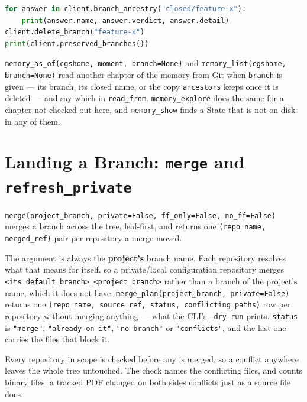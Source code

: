 \begin{lstlisting}[language=Python]
for answer in client.branch_ancestry("closed/feature-x"):
    print(answer.name, answer.verdict, answer.detail)
client.delete_branch("feature-x")
print(client.preserved_branches())
\end{lstlisting}

\texttt{memory\_as\_of(cgshome, moment, branch=None)} and
\texttt{memory\_list(cgshome, branch=None)} read another chapter of the
memory from Git when \texttt{branch} is given --- its branch, its closed
name, or the copy \texttt{ancestors} keeps once it is deleted --- and say
which in \texttt{read\_from}. \texttt{memory\_explore} does the same for a
chapter not checked out here, and \texttt{memory\_show} finds a State that
is not on disk in any of them.

\section{Landing a Branch: \texttt{merge} and \texttt{refresh\_private}}

\texttt{merge(project\_branch, private=False, ff\_only=False, no\_ff=False)}
merges a branch across the tree, leaf-first, and returns one
\texttt{(repo\_name, merged\_ref)} pair per repository a merge moved.

The argument is always the \textbf{project's} branch name. Each repository
resolves what that means for itself, so a private/local configuration
repository merges \texttt{<its default\_branch>\_<project\_branch>} rather
than a branch of the project's name, which it does not have.
\texttt{merge\_plan(project\_branch, private=False)} returns one
\texttt{(repo\_name, source\_ref, status, conflicting\_paths)} row per
repository without merging anything --- what the CLI's \texttt{--dry-run}
prints. \texttt{status} is \texttt{"merge"}, \texttt{"already-on-it"},
\texttt{"no-branch"} or \texttt{"conflicts"}, and the last one carries the
files that block it.

Every repository in scope is checked before any is merged, so a conflict
anywhere leaves the whole tree untouched. The check names the conflicting
files, and counts binary files: a tracked PDF changed on both sides
conflicts just as a source file does.

